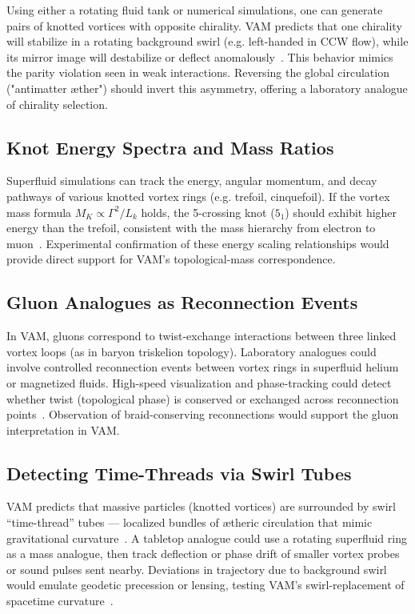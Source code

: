 Using either a rotating fluid tank or numerical simulations, one can generate pairs of knotted vortices with opposite chirality. VAM predicts that one chirality will stabilize in a rotating background swirl (e.g. left-handed in CCW flow), while its mirror image will destabilize or deflect anomalously~\cite{iskandarani2025vam5}. This behavior mimics the parity violation seen in weak interactions. Reversing the global circulation ("antimatter æther") should invert this asymmetry, offering a laboratory analogue of chirality selection.

\subsection*{Knot Energy Spectra and Mass Ratios}

Superfluid simulations can track the energy, angular momentum, and decay pathways of various knotted vortex rings (e.g. trefoil, cinquefoil). If the vortex mass formula $M_K \propto \Gamma^2 / L_k$ holds, the 5-crossing knot ($5_1$) should exhibit higher energy than the trefoil, consistent with the mass hierarchy from electron to muon~\cite{iskandarani2025vam5}. Experimental confirmation of these energy scaling relationships would provide direct support for VAM’s topological-mass correspondence.

\subsection*{Gluon Analogues as Reconnection Events}

In VAM, gluons correspond to twist-exchange interactions between three linked vortex loops (as in baryon triskelion topology). Laboratory analogues could involve controlled reconnection events between vortex rings in superfluid helium or magnetized fluids. High-speed visualization and phase-tracking could detect whether twist (topological phase) is conserved or exchanged across reconnection points~\cite{iskandarani2025vam5}. Observation of braid-conserving reconnections would support the gluon interpretation in VAM.

\subsection*{Detecting Time-Threads via Swirl Tubes}

VAM predicts that massive particles (knotted vortices) are surrounded by swirl “time-thread” tubes — localized bundles of ætheric circulation that mimic gravitational curvature~\cite{iskandarani2025vam2}. A tabletop analogue could use a rotating superfluid ring as a mass analogue, then track deflection or phase drift of smaller vortex probes or sound pulses sent nearby. Deviations in trajectory due to background swirl would emulate geodetic precession or lensing, testing VAM’s swirl-replacement of spacetime curvature~\cite{iskandarani2025vam2}.

